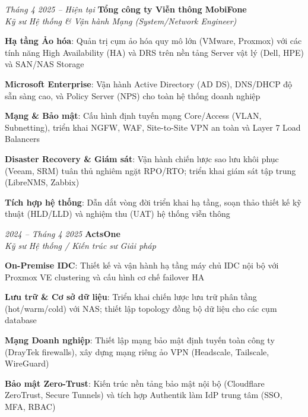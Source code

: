 \begin{twocolentry}{\textit{Tháng 4 2025 -- Hiện tại}}
    \textbf{Tổng công ty Viễn thông MobiFone} \\[4pt]
    \textit{Kỹ sư Hệ thống \& Vận hành Mạng (System/Network Engineer)}
\end{twocolentry}
\begin{onecolentry}
    \begin{highlights}
        \item \textbf{Hạ tầng Ảo hóa}: Quản trị cụm ảo hóa quy mô lớn (VMware, Proxmox) với các tính năng High Availability (HA) và DRS trên nền tảng Server vật lý (Dell, HPE) và SAN/NAS Storage
        \item \textbf{Microsoft Enterprise}: Vận hành Active Directory (AD DS), DNS/DHCP độ sẵn sàng cao, và Policy Server (NPS) cho toàn hệ thống doanh nghiệp
        \item \textbf{Mạng \& Bảo mật}: Cấu hình định tuyến mạng Core/Access (VLAN, Subnetting), triển khai NGFW, WAF, Site-to-Site VPN an toàn và Layer 7 Load Balancers
        \item \textbf{Disaster Recovery \& Giám sát}: Vận hành chiến lược sao lưu khôi phục (Veeam, SRM) tuân thủ nghiêm ngặt RPO/RTO; triển khai giám sát tập trung (LibreNMS, Zabbix)
        \item \textbf{Tích hợp hệ thống}: Dẫn dắt vòng đời triển khai hạ tầng, soạn thảo thiết kế kỹ thuật (HLD/LLD) và nghiệm thu (UAT) hệ thống viễn thông
    \end{highlights}
\end{onecolentry}
\vspace{0.2 cm}

\begin{twocolentry}{\textit{2024 -- Tháng 4 2025}}
    \textbf{ActsOne} \\[4pt]
    \textit{Kỹ sư Hệ thống / Kiến trúc sư Giải pháp}
\end{twocolentry}
\begin{onecolentry}
    \begin{highlights}
        \item \textbf{On-Premise IDC}: Thiết kế và vận hành hạ tầng máy chủ IDC nội bộ với Proxmox VE clustering và cấu hình cơ chế failover HA
        \item \textbf{Lưu trữ \& Cơ sở dữ liệu}: Triển khai chiến lược lưu trữ phân tầng (hot/warm/cold) với NAS; thiết lập topology đồng bộ dữ liệu cho các cụm database
        \item \textbf{Mạng Doanh nghiệp}: Thiết lập mạng bảo mật định tuyến toàn công ty (DrayTek firewalls), xây dựng mạng riêng ảo VPN (Headscale, Tailscale, WireGuard)
        \item \textbf{Bảo mật Zero-Trust}: Kiến trúc nền tảng bảo mật nội bộ (Cloudflare ZeroTrust, Secure Tunnels) và tích hợp Authentik làm IdP trung tâm (SSO, MFA, RBAC)
    \end{highlights}
\end{onecolentry}
\vspace{0.2 cm}

